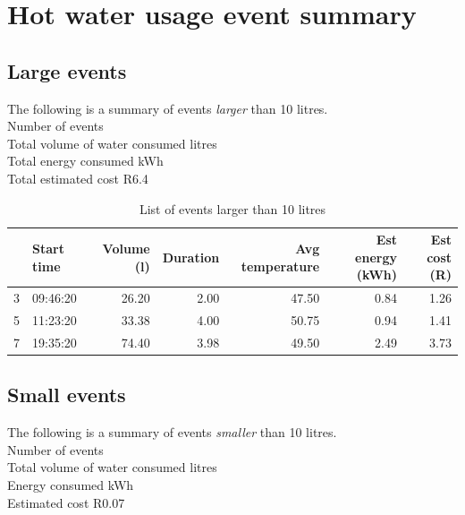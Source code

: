 \documentclass{article}\usepackage[]{graphicx}\usepackage[]{color}
\newenvironment{knitrout}{}{} %
\begin{document}
\newpage
\section{Hot water usage event summary}



\subsection{Large events}

The following is a summary of events \textit{larger} than 10 litres. \\

Number of events \\
Total volume of water consumed  litres\\
Total energy consumed  kWh\\
Total estimated cost \dotfill R6.4\\

\begin{center}
\begin{table}[h!]
\begin{knitrout}
\color{fgcolor}
\begin{tabular}{l|l|r|r|r|r|r}
\hline
  & Start time & Volume (l) & Duration & Avg temperature & Est energy (kWh) & Est cost (R)\\
\hline
3 & 09:46:20 & 26.20 & 2.00 & 47.50 & 0.84 & 1.26\\
\hline
5 & 11:23:20 & 33.38 & 4.00 & 50.75 & 0.94 & 1.41\\
\hline
7 & 19:35:20 & 74.40 & 3.98 & 49.50 & 2.49 & 3.73\\
\hline
\end{tabular}


\end{knitrout}
\caption{List of events larger than 10 litres}
\end{table}
\end{center}


\subsection{Small events}

The following is a summary of events \textit{smaller} than 10 litres. \\

Number of events \\
Total volume of water consumed  litres\\
Energy consumed  kWh\\
Estimated cost \dotfill R0.07\\
\end{document}

